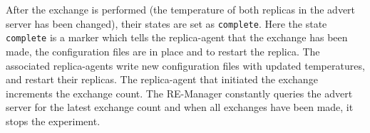 \documentclass{rspublic}
\newcommand{\jhanote}[1]{ {\textcolor{red} { ***shantenu: #1 }}}
\newcommand{\athotanote}[1]{ {\textcolor{green} { ***athota: #1 }}}
\newcommand{\athotanote}[1]{}
\newcommand{\jhanote}[1]{}
\begin{document}
After the exchange is performed (the temperature of both replicas in
the advert server has been changed), their states are set as
\texttt{complete}. Here the state \texttt{complete} is a marker
which tells the replica-agent that the exchange has been made, the
configuration files are in place and to restart the replica.  
The associated replica-agents write new
configuration files with updated temperatures, and restart their
replicas. The replica-agent that initiated the exchange increments the
exchange count. The RE-Manager constantly queries the advert server
for the latest exchange count and when all exchanges have been made,
it stops the experiment.









\end{document}
